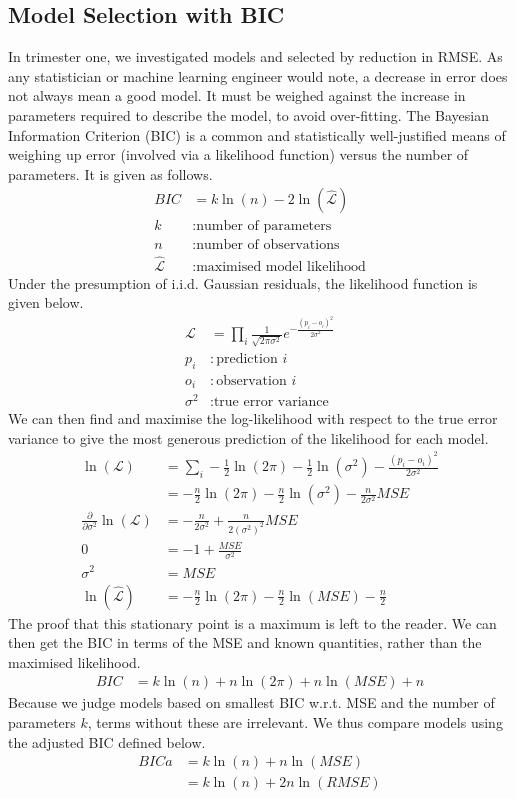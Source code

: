 \documentclass[12pt,a4paper]{article} %
\begin{document}
\subsection{Model Selection with BIC}
In trimester one, we investigated models and selected by reduction in RMSE. As any statistician or machine learning engineer would note, a decrease in error does not always mean a good model. It must be weighed against the increase in parameters required to describe the model, to avoid over-fitting. The Bayesian Information Criterion (BIC) is a common and statistically well-justified means of weighing up error (involved via a likelihood function) versus the number of parameters\cite{shwarz}. It is given as follows.
\begin{align*}
    BIC&=k\ln(n)-2\ln(\hat{\mathcal{L}})\\
    k&:\text{number of parameters}\\
    n&:\text{number of observations}\\
    \hat{\mathcal{L}}&:\text{maximised model likelihood}
\end{align*}
Under the presumption of i.i.d. Gaussian residuals, the likelihood function is given below.
\begin{align*}
    \mathcal{L}&=\prod_{i}\frac{1}{\sqrt{2\pi\sigma^2}}e^{-\frac{(p_i-o_i)^2}{2\sigma^2}}\\
    p_i&:\text{prediction }i\\
    o_i&:\text{observation }i\\
    \sigma^2&:\text{true error variance}
\end{align*}
We can then find and maximise the log-likelihood with respect to the true error variance to give the most generous prediction of the likelihood for each model.
\begin{align*}
    \ln(\mathcal{L})&=\sum_i-\frac12\ln(2\pi)-\frac12\ln(\sigma^2)-\frac{(p_i-o_i)^2}{2\sigma^2}\\
    &=-\frac n2\ln(2\pi)-\frac n2\ln(\sigma^2)-\frac{n}{2\sigma^2}MSE\\
    \frac{\partial}{\partial\sigma^2}\ln(\mathcal{L})&=-\frac{n}{2\sigma^2}+\frac{n}{2(\sigma^2)^2}MSE\\
    0&=-1+\frac{MSE}{\sigma^2}\\
    \sigma^2&=MSE\\
    \ln(\hat{\mathcal{L}})&=-\frac{n}{2}\ln(2\pi)-\frac{n}{2}\ln(MSE)-\frac n2
\end{align*}
The proof that this stationary point is a maximum is left to the reader. We can then get the BIC in terms of the MSE and known quantities, rather than the maximised likelihood.
\begin{align*}
    BIC&=k\ln(n)+n\ln(2\pi)+n\ln(MSE)+n
\end{align*}
Because we judge models based on smallest BIC w.r.t. MSE and the number of parameters $k$, terms without these are irrelevant. We thus compare models using the adjusted BIC defined below.
\begin{align*}
    BICa&=k\ln(n)+n\ln(MSE)\\
    &=k\ln(n)+2n\ln(RMSE)
\end{align*}
\end{document}
